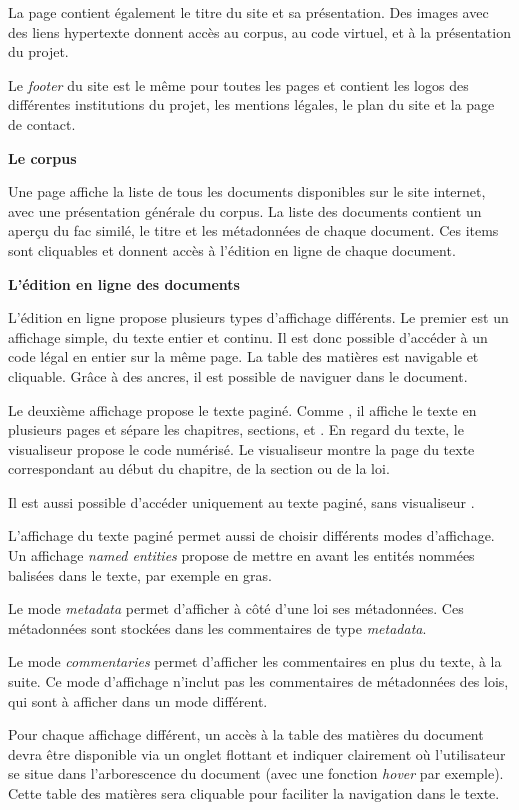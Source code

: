 La page contient également le titre du site et sa présentation. Des images avec des liens hypertexte donnent accès au corpus, au code virtuel, et à la présentation du projet. 

Le \textit{footer} du site est le même pour toutes les pages et contient les logos des différentes institutions du projet, les mentions légales, le plan du site et la page de contact. 

\bigskip
\textbf{Le corpus}

Une page affiche la liste de tous les documents disponibles sur le site internet, avec une présentation générale du corpus. La liste des documents contient un aperçu du fac similé, le titre et les métadonnées de chaque document. Ces items sont cliquables et donnent accès à l’édition en ligne de chaque document.

\bigskip
\textbf{L’édition en ligne des documents}

L’édition en ligne propose plusieurs types d’affichage différents. Le premier est un affichage simple, du texte entier et continu. Il est donc possible d’accéder à un code légal en entier sur la même page. La table des matières est navigable et cliquable. Grâce à des ancres, il est possible de naviguer dans le document. 

Le deuxième affichage propose le texte paginé. Comme \LSC, il affiche le texte en plusieurs pages et sépare les chapitres, sections, \lu et \li. En regard du texte, le visualiseur \IIIF propose le code numérisé. Le visualiseur montre la page du texte correspondant au début du chapitre, de la section ou de la loi.

Il est aussi possible d’accéder uniquement au texte paginé, sans visualiseur \IIIF. 

L’affichage du texte paginé permet aussi de choisir différents modes d’affichage. Un affichage \textit{named entities} propose de mettre en avant les entités nommées balisées dans le texte, par exemple en gras. 

Le mode \textit{metadata} permet d’afficher à côté d’une loi ses métadonnées. Ces métadonnées sont stockées dans les commentaires de type \textit{metadata}.

Le mode \textit{commentaries} permet d’afficher les commentaires en plus du texte, à la suite. Ce mode d’affichage n’inclut pas les commentaires de métadonnées des lois, qui sont à afficher dans un mode différent. 

Pour chaque affichage différent, un accès à la table des matières du document devra être disponible via un onglet flottant et indiquer clairement où l’utilisateur se situe dans l’arborescence du document (avec une fonction \textit{hover} par exemple). Cette table des matières sera cliquable pour faciliter la navigation dans le texte. 


